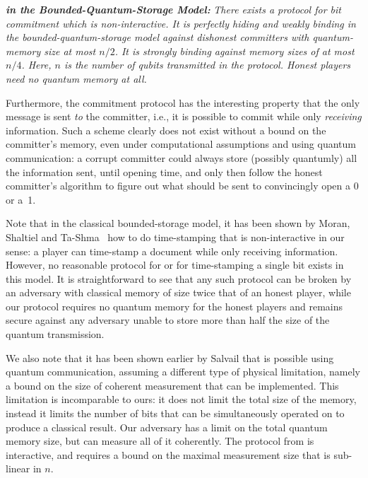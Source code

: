 \medskip
\noindent
{\bf {\em \BC in the Bounded-Quantum-Storage Model:}} {\em There
  exists a protocol for bit commitment which is non-interactive.
 It is perfectly hiding and weakly binding in the
  bounded-quantum-storage model against dishonest committers with
  quantum-memory size at most $n/2$. It is strongly binding against
  memory sizes of at most $n/4$. Here, $n$ is the number of qubits
  transmitted in the protocol. Honest players need no quantum memory
  at all.}  \medskip


Furthermore, the commitment protocol has the interesting property that
the only message is sent \emph{to} the committer, i.e., it is possible
to commit while only {\em receiving} information.  Such a scheme
clearly does not exist without a bound on the committer's memory, even
under computational assumptions and using quantum communication: a
corrupt committer could always store (possibly quantumly) all the
information sent, until opening time, and only then follow the honest
committer's algorithm to figure out what should be sent to
convincingly open a 0 or a~1.  

Note that in the classical
bounded-storage model, it has been shown by Moran, Shaltiel and
Ta-Shma~\cite{MST04} how to do time-stamping
that is non-interactive in our sense: a player can time-stamp a
document while only receiving information.  However, no reasonable
protocol for \BC or for time-stamping a single bit exists in this
model.  It is straightforward to see that any such protocol can be
broken by an adversary with classical memory of size twice that of an
honest player, while our protocol requires no quantum memory for the
honest players and remains secure against any adversary unable to
store more than half the size of the quantum transmission.

We also note that it has been shown earlier by Salvail
\cite{Salvail98} that \BC is possible using quantum communication,
assuming a different type of physical limitation, namely a bound on
the size of coherent measurement that can be implemented. This
limitation is incomparable to ours: it does not limit the total size
of the memory, instead it limits the number of bits that can be
simultaneously operated on to produce a classical result. Our
adversary has a limit on the total quantum memory size, but can
measure all of it coherently. The protocol from \cite{Salvail98} is
interactive, and requires a bound on the maximal measurement size that
is sub-linear in $n$.

